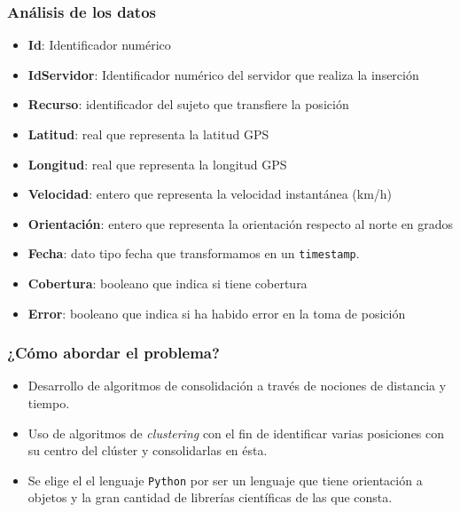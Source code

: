 \documentclass[10pt, spanish]{beamer}
\begin{document}
\begin{frame}[fragile]
\frametitle{An\'alisis de los datos}
  \begin{itemize}[<+- | alert@+>]    
\item \textbf{Id}: Identificador num\'erico
\item \textbf{IdServidor}: Identificador num\'erico del servidor que realiza la inserci\'on
\item \textbf{Recurso}: identificador del sujeto que transfiere la posici\'on
\item \textbf{Latitud}: real que representa la latitud GPS
\item \textbf{Longitud}: real que representa la longitud GPS
\item \textbf{Velocidad}: entero que representa la velocidad instant\'anea (km/h)
\item \textbf{Orientaci\'on}: entero que representa la orientaci\'on respecto al norte en grados
\item \textbf{Fecha}: dato tipo fecha que transformamos en un \texttt{timestamp}.
\item \textbf{Cobertura}: booleano que indica si tiene cobertura
\item \textbf{Error}: booleano que indica si ha habido error en la toma de posici\'on
  \end{itemize}
\end{frame}

\begin{frame}[fragile]
\frametitle{¿C\'omo abordar el problema?}
\begin{itemize}

\item Desarrollo de algoritmos de consolidaci\'on a trav\'es de nociones de distancia y tiempo.

\item Uso de algoritmos de \textit{clustering} con el fin de identificar varias posiciones con su centro del cl\'uster y consolidarlas en \'esta.

\item Se elige el el lenguaje \texttt{Python} por ser un lenguaje que tiene orientaci\'on a objetos y la gran cantidad de librer\'ias cient\'ificas de las que consta.

\end{itemize}
\end{frame}
\end{document}
